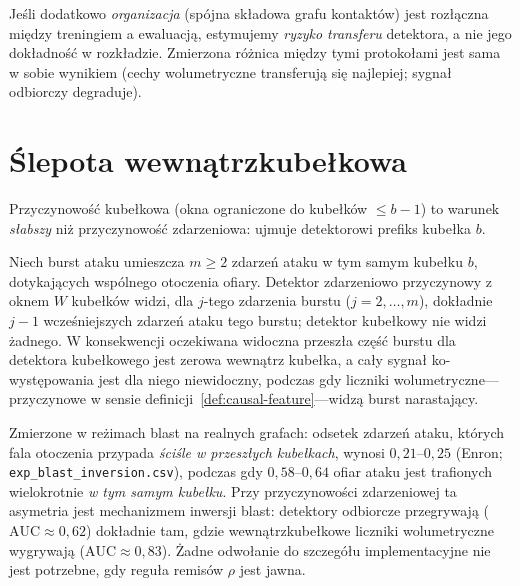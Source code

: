 \begin{corollary}
Jeśli dodatkowo \emph{organizacja} (spójna składowa grafu kontaktów)
jest rozłączna między treningiem a ewaluacją, estymujemy \emph{ryzyko
transferu} detektora, a nie jego dokładność w rozkładzie. Zmierzona
różnica między tymi protokołami jest sama w sobie wynikiem (cechy
wolumetryczne transferują się najlepiej; sygnał odbiorczy degraduje).
\end{corollary}

\chapter{Ślepota wewnątrzkubełkowa}
\label{sec:withinbucket}

Przyczynowość kubełkowa (okna ograniczone do kubełków $\le b-1$) to
warunek \emph{słabszy} niż przyczynowość zdarzeniowa: ujmuje detektorowi
prefiks kubełka $b$.

\begin{proposition}
\label{prop:withinbucket}
Niech burst ataku umieszcza $m\ge2$ zdarzeń ataku w tym samym kubełku
$b$, dotykających wspólnego otoczenia ofiary. Detektor zdarzeniowo
przyczynowy z oknem $W$ kubełków widzi, dla $j$-tego zdarzenia burstu
($j=2,\dots,m$), dokładnie $j-1$ wcześniejszych zdarzeń ataku tego
burstu; detektor kubełkowy nie widzi żadnego. W konsekwencji oczekiwana
widoczna przeszła część burstu dla detektora kubełkowego jest zerowa
wewnątrz kubełka, a cały sygnał ko-występowania jest dla niego
niewidoczny, podczas gdy liczniki wolumetryczne---przyczynowe w sensie
definicji~\ref{def:causal-feature}---widzą burst narastający.
\end{proposition}

\begin{remark}
Zmierzone w reżimach blast na realnych grafach: odsetek zdarzeń ataku,
których fala otoczenia przypada \emph{ściśle w przeszłych kubełkach},
wynosi $0{,}21$--$0{,}25$ (Enron; \texttt{exp\_blast\_inversion.csv}),
podczas gdy $0{,}58$--$0{,}64$ ofiar ataku jest trafionych wielokrotnie
\emph{w tym samym kubełku}. Przy przyczynowości zdarzeniowej ta
asymetria jest mechanizmem inwersji blast: detektory odbiorcze przegrywają
($\mathrm{AUC}\approx0{,}62$) dokładnie tam, gdzie wewnątrzkubełkowe
liczniki wolumetryczne wygrywają ($\mathrm{AUC}\approx0{,}83$). Żadne
odwołanie do szczegółu implementacyjne nie jest potrzebne, gdy reguła
remisów $\rho$ jest jawna.
\end{remark}

